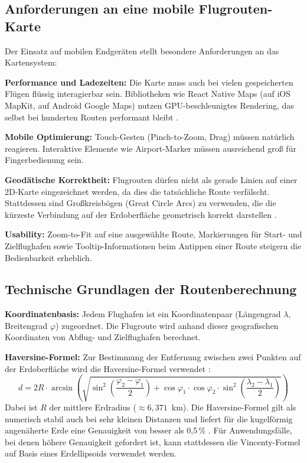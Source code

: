 \subsection{Anforderungen an eine mobile Flugrouten-Karte}

Der Einsatz auf mobilen Endgeräten stellt besondere Anforderungen an das Kartensystem:

\textbf{Performance und Ladezeiten:} Die Karte muss auch bei vielen gespeicherten Flügen flüssig interagierbar sein.
Bibliotheken wie React Native Maps (auf iOS MapKit, auf Android Google Maps) nutzen GPU-beschleunigtes Rendering, das selbst bei hunderten Routen performant bleibt \cite{reactNativeMaps,mapboxMaps}.

\textbf{Mobile Optimierung:} Touch-Gesten (Pinch-to-Zoom, Drag) müssen natürlich reagieren.
Interaktive Elemente wie Airport-Marker müssen ausreichend groß für Fingerbedienung sein.

\textbf{Geodätische Korrektheit:} Flugrouten dürfen nicht als gerade Linien auf einer 2D-Karte eingezeichnet werden, da dies die tatsächliche Route verfälscht.
Stattdessen sind Großkreisbögen (Great Circle Arcs) zu verwenden, die die kürzeste Verbindung auf der Erdoberfläche geometrisch korrekt darstellen \cite{leafletArc}.

\textbf{Usability:} Zoom-to-Fit auf eine ausgewählte Route, Markierungen für Start- und Zielflughafen sowie Tooltip-Informationen beim Antippen einer Route steigern die Bedienbarkeit erheblich.

\subsection{Technische Grundlagen der Routenberechnung}

\textbf{Koordinatenbasis:} Jedem Flughafen ist ein Koordinatenpaar (Längengrad $\lambda$, Breitengrad $\varphi$) zugeordnet.
Die Flugroute wird anhand dieser geografischen Koordinaten von Abflug- und Zielflughafen berechnet.

\textbf{Haversine-Formel:} Zur Bestimmung der Entfernung zwischen zwei Punkten auf der Erdoberfläche wird die Haversine-Formel verwendet \cite{wikipediaHaversine,movableTypeLatLong}:
\begin{equation}
  d = 2R \cdot \arcsin\left(\sqrt{\sin^2\!\left(\frac{\varphi_2-\varphi_1}{2}\right) + \cos\varphi_1 \cdot \cos\varphi_2 \cdot \sin^2\!\left(\frac{\lambda_2-\lambda_1}{2}\right)}\right)
\end{equation}
Dabei ist $R$ der mittlere Erdradius ($\approx 6{,}371$~km).
Die Haversine-Formel gilt als numerisch stabil auch bei sehr kleinen Distanzen und liefert für die kugelförmig angenäherte Erde eine Genauigkeit von besser als 0{,}5\,\% \cite{wikipediaGreatCircle}.
Für Anwendungsfälle, bei denen höhere Genauigkeit gefordert ist, kann stattdessen die Vincenty-Formel auf Basis eines Erdellipsoids verwendet werden.

